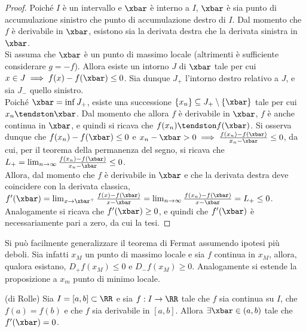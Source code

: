 \documentclass[11pt]{article}
\begin{document}
	\begin{proof}
		Poiché $I$ è un intervallo e $\xbar$ è interno a $I$, $\xbar$ è sia punto di accumulazione
		sinistro che punto di accumulazione destro di $I$. Dal momento che $f$ è derivabile
		in $\xbar$, esistono sia la derivata destra che la derivata sinistra in $\xbar$. \\
		
		Si assuma che $\xbar$ è un punto di massimo locale (altrimenti è sufficiente considerare $g = -f$).
		Allora esiste un intorno $J$ di $\xbar$ tale per cui $x \in J \implies f(x) - f(\xbar) \leq 0$. Sia dunque
		$J_+$ l'intorno destro relativo a $J$, e sia $J_-$ quello sinistro. \\
		
		Poiché $\xbar = \inf J_+$, esiste una successione $\{x_n\} \subseteq J_+ \setminus \{\xbar\}$ tale
		per cui $x_n \tendston \xbar$. Dal momento che allora $f$ è derivabile in $\xbar$, $f$ è anche
		continua in $\xbar$, e quindi si ricava che $f(x_n) \tendston f(\xbar)$. Si osserva dunque
		che $f(x_n) - f(\xbar) \leq 0$ e $x_n - \xbar > 0 \implies \frac{f(x_n) - f(\xbar)}{x_n - \xbar} \leq 0$,
		da cui, per il teorema della permanenza del segno, si ricava che $L_+ = \lim_{n \to \infty} \frac{f(x_n) - f(\xbar)}{x_n - \xbar} \leq 0$. \\
		
		Allora, dal momento che $f$ è derivabile in $\xbar$ e che la derivata destra
		deve coincidere con la derivata classica, $f'(\xbar) =
		\lim_{x \to \xbar^+} \frac{f(x) - f(\xbar)}{x-\xbar} = \lim_{n \to \infty} \frac{f(x_n) - f(\xbar)}{x-\xbar} = L_+ \leq 0$. \\
		
		Analogamente si ricava che $f'(\xbar) \geq 0$, e quindi che $f'(\xbar)$ è necessariamente pari a zero, da cui la
		tesi.
	\end{proof}

	\begin{remark} \nl
		\li Si può facilmente generalizzare il teorema di Fermat assumendo ipotesi più deboli. Sia infatti $x_M$ un punto di massimo locale e sia $f$ continua in $x_M$,
		allora, qualora esistano, $D_+ f(x_M) \leq 0$ e $D_- f(x_M) \geq 0$. Analogamente
		si estende la proposizione a $x_m$ punto di minimo locale. 
	\end{remark}

	\begin{theorem} (di Rolle)
		Sia $I = [a, b] \subset \RR$ e sia $f : I \to \RR$ tale che
		$f$ sia continua su $I$, che $f(a) = f(b)$ e che $f$ sia derivabile
		in $[a, b]$. Allora $\exists \xbar \in (a, b)$ tale che $f'(\xbar) = 0$.
	\end{theorem}
\end{document}
